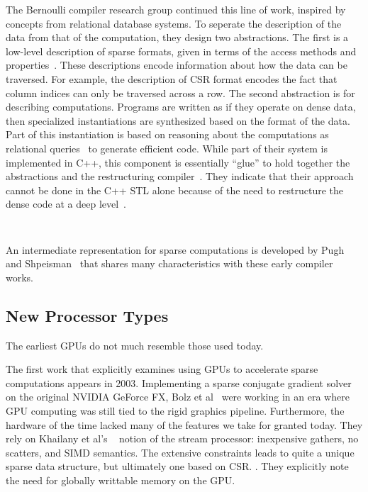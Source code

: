 The Bernoulli compiler research group continued this line of work, inspired by concepts from relational database systems. 
To seperate the description of the data from that of the computation, they design two abstractions.
The first is a low-level description of sparse formats, given in terms of the access methods and properties~\cite{kotlyar1997compiling}. 
These descriptions encode information about how the data can be traversed. 
For example, the description of CSR format encodes the fact that column indices can only be traversed across a row. 
The second abstraction is for describing computations.
Programs are written as if they operate on dense data, then specialized instantiations are synthesized based on the format of the data.
Part of this instantiation is based on reasoning about the computations as relational queries~\cite{kotlyar1997relational} to generate efficient code. 
While part of their system is implemented in C++, this component is essentially \enquote{glue} to hold together the abstractions and the restructuring compiler~\cite{mateev2000bernoulli}.
They indicate that their approach cannot be done in the C++ STL alone because of the need to restructure the dense code at a deep level~\cite{ahmed2000framework}.
\begin{figure}[h]
\begin{lstlisting}[caption={SpMV written using Bernoulli group representation.}]
  
\end{lstlisting}
\end{figure}
An intermediate representation for sparse computations is developed by Pugh and Shpeisman~\cite{pugh1999sipr} that shares many characteristics with these early compiler works.



\subsection{New Processor Types}

The earliest GPUs do not much resemble those used today.

The first work that explicitly examines using GPUs to accelerate sparse computations appears in 2003. 
Implementing a sparse conjugate gradient solver on the original NVIDIA GeForce FX, Bolz et al~\cite{bolz2003sparse} were working in an era where GPU computing was still tied to the rigid graphics pipeline. 
Furthermore, the hardware of the time lacked many of the features we take for granted today.
They rely on Khailany et al's ~\cite{findit} notion of the stream processor: inexpensive gathers, no scatters, and SIMD semantics. 
The extensive constraints leads to quite a unique sparse data structure, but ultimately one based on CSR. .
They explicitly note the need for globally writtable memory on the GPU.

